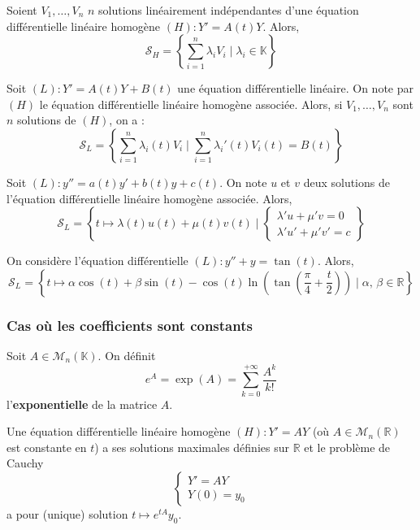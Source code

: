	\begin{proposition}
		Soient $V_1, \dots, V_n$ $n$ solutions linéairement indépendantes d'une équation différentielle linéaire homogène $(H) : Y' = A(t) Y$. Alors,
		\[ \mathcal{S}_H = \left\{\sum_{i=1}^n \lambda_i V_i \mid \lambda_i \in \mathbb{K} \right\} \]
	\end{proposition}

	\begin{corollary}
		Soit $(L) : Y' = A(t) Y + B(t)$ une équation différentielle linéaire. On note par $(H)$ le équation différentielle linéaire homogène associée. Alors, si $V_1, \dots, V_n$ sont $n$ solutions de $(H)$, on a :
		\[ \mathcal{S}_L = \left\{\sum_{i=1}^n \lambda_i(t) V_i \mid \sum_{i=1}^n \lambda_i'(t) V_i(t) = B(t)\right\} \]
	\end{corollary}

	\begin{example}
		Soit $(L) : y'' = a(t) y' + b(t)y + c(t)$. On note $u$ et $v$ deux solutions de l'équation différentielle linéaire homogène associée. Alors,
		\[ \mathcal{S}_L = \left\{t \mapsto \lambda(t) u(t) + \mu(t) v(t) \mid \begin{cases} \lambda'u + \mu'v = 0 \\ \lambda' u' + \mu' v' = c \end{cases} \right\} \]
	\end{example}

	\begin{example}
		On considère l'équation différentielle $(L) : y'' + y = \tan(t)$. Alors,
		\[ \mathcal{S}_L = \left\{t \mapsto \alpha \cos(t) + \beta \sin(t) - \cos(t) \ln \left( \tan \left( \frac{\pi}{4} + \frac{t}{2} \right) \right) \mid \alpha, \, \beta \in \mathbb{R} \right\} \]
	\end{example}

	\subsubsection{Cas où les coefficients sont constants}

	\begin{definition}
		Soit $A \in \mathcal{M}_n(\mathbb{K})$. On définit
		\[ e^{A} = \exp(A) = \sum_{k=0}^{+\infty} \frac{A^k}{k!} \]
		l'\textbf{exponentielle} de la matrice $A$.
	\end{definition}

	\begin{proposition}
		Une équation différentielle linéaire homogène $(H) : Y' = AY$ (où $A \in \mathcal{M}_n(\mathbb{R})$ est constante en $t$) a ses solutions maximales définies sur $\mathbb{R}$ et le problème de Cauchy
		\[ \begin{cases} Y' = AY \\ Y(0) = y_0 \end{cases} \]
		a pour (unique) solution $t \mapsto e^{tA} y_0$.
	\end{proposition}

